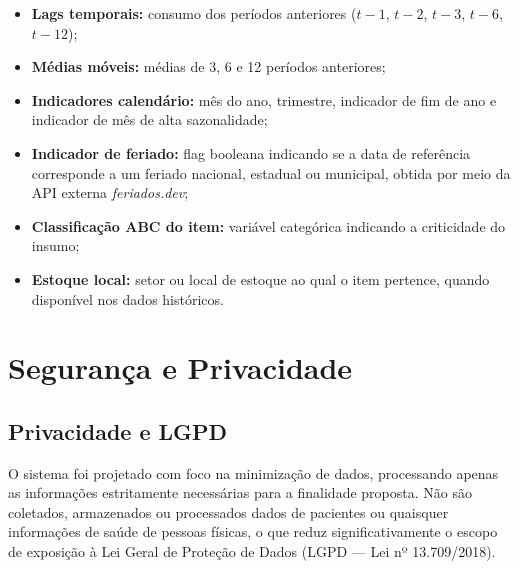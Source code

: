 \documentclass[12pt,a4paper]{article}
\begin{document}
\begin{itemize}
    \item \textbf{Lags temporais:} consumo dos períodos anteriores
          ($t-1$, $t-2$, $t-3$, $t-6$, $t-12$);
    \item \textbf{Médias móveis:} médias de 3, 6 e 12 períodos anteriores;
    \item \textbf{Indicadores calendário:} mês do ano, trimestre,
          indicador de fim de ano e indicador de mês de alta sazonalidade;
    \item \textbf{Indicador de feriado:} flag booleana indicando se a
          data de referência corresponde a um feriado nacional, estadual
          ou municipal, obtida por meio da API externa
          \textit{feriados.dev};
    \item \textbf{Classificação ABC do item:} variável categórica
          indicando a criticidade do insumo;
    \item \textbf{Estoque local:} setor ou local de estoque ao qual o
          item pertence, quando disponível nos dados históricos.
\end{itemize}



\section{Segurança e Privacidade}
\subsection{Privacidade e LGPD}

O sistema foi projetado com foco na minimização de dados, processando
apenas as informações estritamente necessárias para a finalidade proposta.
Não são coletados, armazenados ou processados dados de pacientes ou
quaisquer informações de saúde de pessoas físicas, o que reduz
significativamente o escopo de exposição à Lei Geral de Proteção de Dados
(LGPD — Lei nº 13.709/2018).
\end{document}
